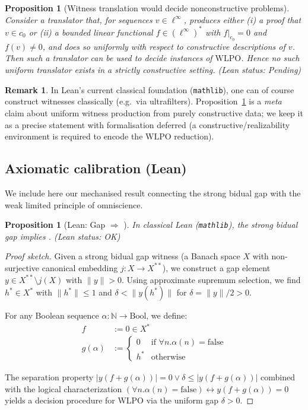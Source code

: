 \documentclass[11pt]{article}
\newtheorem{proposition}[theorem]{Proposition}
\theoremstyle{definition}
\newtheorem{remark}[theorem]{Remark}
\newcommand{\linf}{\ell^\infty}
\newcommand{\cnull}{c_0}
\newcommand{\WLPO}{\mathrm{WLPO}}
\newcommand{\leanok}{\textsf{\small (Lean status: OK)}}
\newcommand{\leanpending}{\textsf{\small (Lean status: Pending)}}
\begin{document}
\begin{proposition}[Witness translation would decide nonconstructive problems]\label{prop:obstruction}
Consider a \emph{translator} that, for sequences $v\in\linf$, produces either
(i) a proof that $v\in\cnull$ or (ii) a bounded linear functional $f\in(\linf)^*$
with $f|_{\cnull}=0$ and $f(v)\ne0$, and does so uniformly with respect to
constructive descriptions of $v$. Then such a translator can be used to decide
instances of $\WLPO$. Hence no such uniform translator exists in a strictly constructive
setting. \leanpending
\end{proposition}

\begin{remark}
In Lean's current classical foundation (\texttt{mathlib}), one can of course
construct witnesses classically (e.g.\ via ultrafilters). Proposition~\ref{prop:obstruction}
is a \emph{meta} claim about uniform witness production from purely constructive data;
we keep it as a precise statement with formalisation deferred (a constructive/realizability
environment is required to encode the $\WLPO$ reduction).
\end{remark}

\subsection{Axiomatic calibration (Lean)}

We include here our mechanised result connecting the strong bidual gap with the weak limited
principle of omniscience.

\begin{proposition}[Lean: Gap $\Rightarrow$ \WLPO]\label{prop:gap-to-wlpo}
In classical Lean (\texttt{mathlib}), the strong bidual gap implies \WLPO. \leanok
\end{proposition}

\begin{proof}[Proof sketch]
Given a strong bidual gap witness (a Banach space $X$ with non-surjective canonical
embedding $j: X \to X^{**}$), we construct a gap element $y \in X^{**} \setminus j(X)$
with $\|y\| > 0$. Using approximate supremum selection, we find $h^* \in X^*$ with
$\|h^*\| \leq 1$ and $\delta < \|y(h^*)\|$ for $\delta = \|y\|/2 > 0$. 

For any Boolean sequence $\alpha: \mathbb{N} \to \mathrm{Bool}$, we define:
\begin{align}
f &:= 0 \in X^* \\
g(\alpha) &:= \begin{cases} 0 & \text{if } \forall n. \alpha(n) = \mathrm{false} \\ h^* & \text{otherwise} \end{cases}
\end{align}

The separation property $|y(f + g(\alpha))| = 0 \vee \delta \leq |y(f + g(\alpha))|$
combined with the logical characterization $(\forall n. \alpha(n) = \mathrm{false}) \leftrightarrow y(f + g(\alpha)) = 0$
yields a decision procedure for WLPO via the uniform gap $\delta > 0$.
\end{proof}
\end{document}
